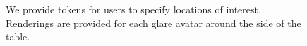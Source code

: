 \documentclass[10pt,twocolumn,letterpaper]{article}
\begin{document}
\begin{figure}[t]
\hfill
{}\\

\vspace{-2.75in}
\hspace*{1in} \hfill 
{}\\

\vspace{1.2in}
\caption{We provide tokens for users to specify locations of interest.  Renderings are provided for each glare avatar around the side of the table.}
\vspace{-0.15in}
\label{FIGURE:teaser}
\end{figure}
\end{document}
